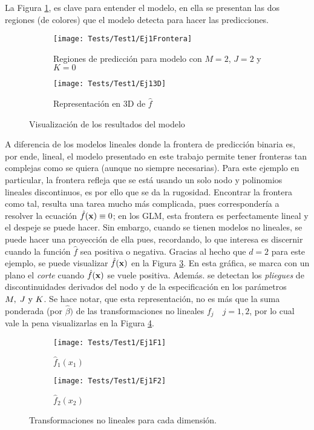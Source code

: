 \documentclass[../Main/Main.tex]{subfiles}
\begin{document}
La Figura \ref{fig:Test1Ej1}, es clave para entender el modelo, en ella se presentan las dos regiones (de colores) que el modelo detecta para hacer las predicciones.
\begin{figure}[h]
	\centering
	\begin{subfigure}[b]{0.45\textwidth}
    	\texttt{[image: Tests/Test1/Ej1Frontera]}
		\caption{Regiones de predicción para modelo con $M = 2$, $J = 2$ y $K = 0$}
	\label{fig:Test1Ej1}
	\end{subfigure}
	\hfill    
    \begin{subfigure}[b]{0.45\textwidth}
        \texttt{[image: Tests/Test1/Ej13D]}
        \caption{Representación en 3D de $\hat{f}$}
        \label{fig:Test1Ej13D}
    \end{subfigure}
    \caption{Visualización de los resultados del modelo}
\end{figure}
A diferencia de los modelos lineales donde la frontera de predicción binaria es, por ende, lineal, el modelo presentado en este trabajo permite tener fronteras tan complejas como se quiera (aunque no siempre necesarias). Para este ejemplo en particular, la frontera refleja que se está usando un solo nodo y polinomios lineales discontinuos, es por ello que se da la rugosidad. Encontrar la frontera como tal, resulta una tarea mucho más complicada, pues correspondería a resolver la ecuación  $\hat{f}(\mathbf{x}) \equiv 0$; en los GLM, esta frontera es perfectamente lineal y el despeje se puede hacer. Sin embargo, cuando se tienen modelos no lineales, se puede hacer una proyección de ella pues, recordando, lo que interesa es discernir cuando la función $\hat{f}$ sea positiva o negativa. Gracias al hecho que $d = 2$ para este ejemplo, se puede visualizar $\hat{f}(\mathbf{x})$ en la Figura \ref{fig:Test1Ej13D}. En esta gráfica, se marca con un plano el \textit{corte} cuando $\hat{f}(\mathbf{x})$ se vuele positiva. Además. se detectan los \textit{pliegues} de discontinuidades derivados del nodo y de la especificación en los parámetros $M,\;J\text{ y }K$. Se hace notar, que esta representación, no es más que la suma ponderada (por $\hat{\beta})$ de las transformaciones no lineales $f_j \quad j=1,2$, por lo cual vale la pena visualizarlas en la Figura \ref{fig:Test1Ej1Fs}. 
\begin{figure}[h]
    \begin{subfigure}[b]{0.45\textwidth}
        \texttt{[image: Tests/Test1/Ej1F1]}
        \caption{$\hat{f}_1(x_1)$}
    \end{subfigure}
	\hfill
	    \begin{subfigure}[b]{0.45\textwidth}
        \texttt{[image: Tests/Test1/Ej1F2]}
        \caption{$\hat{f}_2(x_2)$}
    \end{subfigure}
    \caption{Transformaciones no lineales para cada dimensión.}\label{fig:Test1Ej1Fs}
\end{figure}
\end{document}
